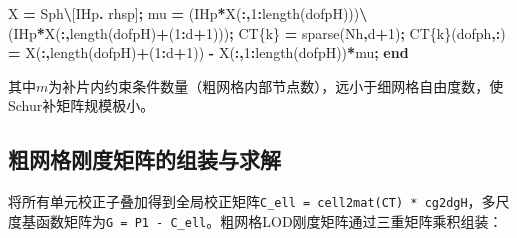 \documentclass[
]{article}
\newenvironment{Shaded}{\begin{snugshade}}{\end{snugshade}}
\newcommand{\FloatTok}[1]{\textcolor[rgb]{0.00,0.00,0.81}{#1}}
\newcommand{\KeywordTok}[1]{\textcolor[rgb]{0.13,0.29,0.53}{\textbf{#1}}}
\newcommand{\NormalTok}[1]{#1}
\newcommand{\OperatorTok}[1]{\textcolor[rgb]{0.81,0.36,0.00}{\textbf{#1}}}
\newcommand{\VariableTok}[1]{\textcolor[rgb]{0.00,0.00,0.00}{#1}}
\begin{document}
\begin{Shaded}
\begin{Highlighting}[]
    \VariableTok{X} \OperatorTok{=} \VariableTok{Sph}\OperatorTok{\textbackslash{}}\NormalTok{[}\VariableTok{IHp}\OperatorTok{.\textquotesingle{}} \VariableTok{rhsp}\NormalTok{]}\OperatorTok{;}
    \VariableTok{mu} \OperatorTok{=}\NormalTok{ (}\VariableTok{IHp}\OperatorTok{*}\VariableTok{X}\NormalTok{(}\OperatorTok{:,}\FloatTok{1}\OperatorTok{:}\VariableTok{length}\NormalTok{(}\VariableTok{dofpH}\NormalTok{)))}\OperatorTok{\textbackslash{}}\NormalTok{(}\VariableTok{IHp}\OperatorTok{*}\VariableTok{X}\NormalTok{(}\OperatorTok{:,}\VariableTok{length}\NormalTok{(}\VariableTok{dofpH}\NormalTok{)}\OperatorTok{+}\NormalTok{(}\FloatTok{1}\OperatorTok{:}\VariableTok{d}\OperatorTok{+}\FloatTok{1}\NormalTok{)))}\OperatorTok{;}
    \VariableTok{CT}\NormalTok{\{}\VariableTok{k}\NormalTok{\} }\OperatorTok{=} \VariableTok{sparse}\NormalTok{(}\VariableTok{Nh}\OperatorTok{,}\VariableTok{d}\OperatorTok{+}\FloatTok{1}\NormalTok{)}\OperatorTok{;}
    \VariableTok{CT}\NormalTok{\{}\VariableTok{k}\NormalTok{\}(}\VariableTok{dofph}\OperatorTok{,:}\NormalTok{) }\OperatorTok{=} \VariableTok{X}\NormalTok{(}\OperatorTok{:,}\VariableTok{length}\NormalTok{(}\VariableTok{dofpH}\NormalTok{)}\OperatorTok{+}\NormalTok{(}\FloatTok{1}\OperatorTok{:}\VariableTok{d}\OperatorTok{+}\FloatTok{1}\NormalTok{)) }\OperatorTok{{-}} \VariableTok{X}\NormalTok{(}\OperatorTok{:,}\FloatTok{1}\OperatorTok{:}\VariableTok{length}\NormalTok{(}\VariableTok{dofpH}\NormalTok{))}\OperatorTok{*}\VariableTok{mu}\OperatorTok{;}
\KeywordTok{end}
\end{Highlighting}
\end{Shaded}

其中\(m\)为补片内约束条件数量（粗网格内部节点数），远小于细网格自由度数，使Schur补矩阵规模极小。

\subsection{粗网格刚度矩阵的组装与求解}\label{chap-5-4}

将所有单元校正子叠加得到全局校正矩阵\texttt{C\_ell\ =\ cell2mat(CT)\ *\ cg2dgH}，多尺度基函数矩阵为\texttt{G\ =\ P1\ -\ C\_ell}。粗网格LOD刚度矩阵通过三重矩阵乘积组装：
\end{document}
